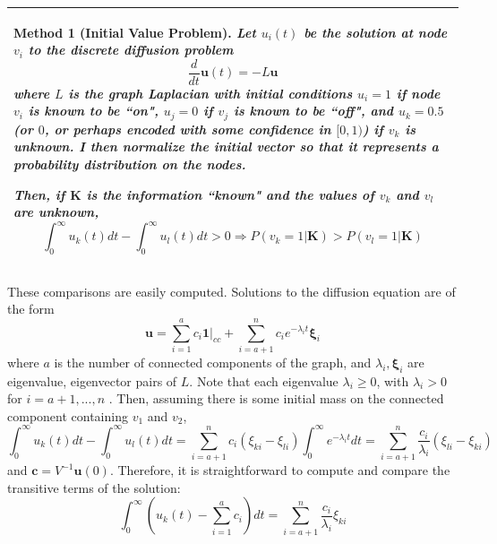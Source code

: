 \documentclass[10pt]{article}
\newtheorem{method}{Method}
\theoremstyle{definition}
\numberwithin{theorem}{section}
\numberwithin{definition}{section}
\numberwithin{lemma}{section}
\numberwithin{corollary}{section}
\numberwithin{clm}{section}
\numberwithin{rmk}{section}
\newenvironment{inbox2}
{\begin{center}
		\begin{tabular}{|p{0.9\textwidth}|}
			\hline \vspace{-0.5 cm}
		}
		{ 
			\\ \hline
		\end{tabular} 
	\end{center}
}
\renewcommand{\b}{\bm}
\begin{document}
\begin{inbox2}
	\begin{method}[Initial Value Problem]\label{initalCond}
		Let $u_i(t)$ be the solution at node $v_i$ to the discrete diffusion problem
		\[
		\frac{d}{dt}\b{u}(t)  = - L\b{u}
		\]
		where $L$ is the  graph Laplacian with initial conditions $u_i = 1$ if node $v_i$ is known to be ``on", $u_j = 0$ if $v_j$ is known to be ``off", and $u_k = 0.5$ (or $0$, or perhaps encoded with some confidence in $[0,1)$) if $v_k$ is unknown. I then normalize the initial vector so that it represents a probability distribution on the nodes.
		
		Then, if $\b{K}$ is the information ``known" and the values of $v_{k}$ and $v_{l}$ are unknown,
		\[
		\int_0^{\infty} u_k(t) dt - \int_0^{\infty} u_l(t) dt >  0 \Rightarrow  P(v_k=  1|\b{K}) > P(v_l = 1|\b{K})
		\]
	\end{method}
\end{inbox2}
These comparisons are easily computed. Solutions to the diffusion equation are of the form
\[
\b{u} = \sum_{i=1}^a c_i \b{1}|_{cc} + \sum_{i=a+1}^n c_i e^{-\lambda_i t} \b{\xi}_i 
\]
where $a$ is the number of connected components of the graph, and $\lambda_i,\b{\xi}_i$ are eigenvalue, eigenvector pairs of $L$. Note that each eigenvalue $\lambda_i \geq 0$, with $\lambda_i>0$ for $i = a+1,...,n$ \cite{vonLuxburg2007}. Then, assuming there is some initial mass on the connected component containing $v_1$ and $v_2$, 
\[
\int_0^{\infty} u_k(t) dt - \int_0^{\infty} u_l(t) dt =   \sum_{i=a+1}^n c_i  (\xi_{ki} - \xi_{li}) \int_0^{\infty} e^{-\lambda_i t} dt = \sum_{i=a+1}^n \frac{c_i}{\lambda_i}  (\xi_{li} - \xi_{ki}) 
\]
and $\b{c} = V^{-1}\b{u}(0)$. Therefore, it is straightforward to compute and compare the transitive terms of the solution:
\begin{equation}\label{ivp_computation}
\int_0^{\infty}\left( u_k(t) - \sum_{i=1}^a c_i \right) dt = \sum_{i=a+1}^n \frac{c_i}{\lambda_i}\xi_{ki}
\end{equation}
\end{document}

